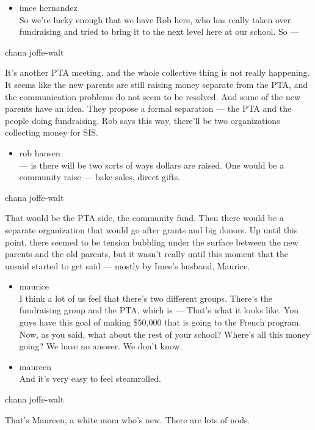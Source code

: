 \begin{itemize}
\tightlist
\item
  imee hernandez\\
  So we're lucky enough that we have Rob here, who has really taken over
  fundraising and tried to bring it to the next level here at our
  school. So ---
\end{itemize}

chana joffe-walt

It's another PTA meeting, and the whole collective thing is not really
happening. It seems like the new parents are still raising money
separate from the PTA, and the communication problems do not seem to be
resolved. And some of the new parents have an idea. They propose a
formal separation --- the PTA and the people doing fundraising. Rob says
this way, there'll be two organizations collecting money for SIS.

\begin{itemize}
\tightlist
\item
  rob hansen\\
  --- is there will be two sorts of ways dollars are raised. One would
  be a community raise --- bake sales, direct gifts.
\end{itemize}

chana joffe-walt

That would be the PTA side, the community fund. Then there would be a
separate organization that would go after grants and big donors. Up
until this point, there seemed to be tension bubbling under the surface
between the new parents and the old parents, but it wasn't really until
this moment that the unsaid started to get said --- mostly by Imee's
husband, Maurice.

\begin{itemize}
\item
  maurice\\
  I think a lot of us feel that there's two different groups. There's
  the fundraising group and the PTA, which is --- That's what it looks
  like. You guys have this goal of making \$50,000 that is going to the
  French program. Now, as you said, what about the rest of your school?
  Where's all this money going? We have no answer. We don't know.
\item
  maureen\\
  And it's very easy to feel steamrolled.
\end{itemize}

chana joffe-walt

That's Maureen, a white mom who's new. There are lots of nods.

